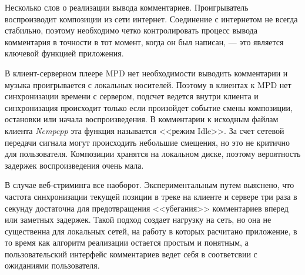 
Несколько слов о реализации вывода комментариев. Проигрыватель
воспроизводит композиции из сети интернет. Соединение с интернетом не
всегда стабильно, поэтому необходимо четко контролировать процесс
вывода комментария в точности в тот момент, когда он был написан, ---
это является ключевой функцией приложения.

В клиент-серверном плеере MPD нет необходимости выводить комментарии и музыка проигрывается с
локальных носителей. Поэтому в клиентах к MPD нет синхронизации
времени с сервером, подсчет ведется внутри клиента и синхронизация
происходит только если произойдет событие смены композиции, остановки
или начала воспроизведения. В комментарии к исходным файлам клиента
\textit{Ncmpcpp} эта функция называется <<режим Idle>>. За счет сетевой
передачи сигнала могут происходить небольшие смещения, но это не
критично для пользователя. Композиции хранятся на локальном диске,
поэтому вероятность задержек воспроизведения очень мала.

В случае веб-стриминга все наоборот. Экспериментальным путем
выяснено, что частота синхронизации текущей позиции в треке на клиенте
и сервере три раза в секунду достаточна для предотвращения
<<убегания>> комментариев вперед или заметных задержек. Такой подход
создает нагрузку на сеть, но она не существенна для локальных сетей,
на работу в которых расчитано приложение, в то время как алгоритм
реализации остается простым и понятным, а пользовательский
интерфейс комментариев ведет себя в соответсвии с ожиданиями
пользователя.
